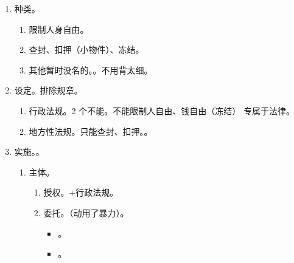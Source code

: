 \begin{enumerate}
\begin{enumerate}
                \begin{kk}{处罚 vs 执行}
                  \begin{enumerate}
                    \item {}不同。行政机关 \hz 授权具有管理公共事务职能的组织；还能由法院实施。
                    \item {}不同。改变了相对人的权利义务；没有改变。
                    \item {}不同。先有处罚；不履行义务，才能启动执行。
                  \end{enumerate}
                \end{kk}
          \item 种类。
                \begin{enumerate}
                  \item 限制人身自由。
                  \item 查封、扣押（小物件）、冻结。
                  \item 其他暂时没名的。。不用背太细。
                \end{enumerate}
          \item 设定。排除规章。
                \begin{enumerate}
                  \item 行政法规。2 个不能。不能限制人自由、钱自由（冻结） \yjt 专属于法律。
                  \item 地方性法规。只能查封、扣押。。
                \end{enumerate}
          \item 实施。。
                \begin{enumerate}
                  \item 主体。
                        \begin{enumerate}
                          \item 授权。+行政法规。
                          \item 委托。（动用了暴力）。
                                \begin{itemize}
                                  \item {}。
                                  \item {}。
                                \end{itemize}

\end{enumerate}
\end{enumerate}
\end{enumerate}
\end{enumerate}
